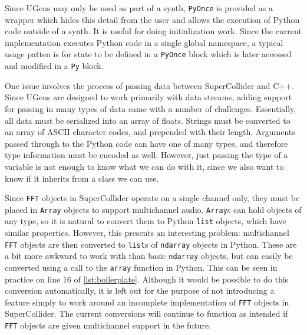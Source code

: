 \documentclass{article}
\begin{document}
Since UGens may only be used as part of a synth, \texttt{PyOnce} is provided as a wrapper which
hides this detail from the user and allows the execution of Python code outside of a synth. It is
useful for doing initialization work. Since the current implementation executes Python code in a
single global namespace, a typical usage patten is for state to be defined in a \texttt{PyOnce}
block which is later accessed and modified in a \texttt{Py} block.

One issue involves the process of passing data between SuperCollider and C++. Since UGens are
designed to work primarily with data streams, adding support for passing in many types of data came
with a number of challenges. Essentially, all data must be serialized into an array of floats.
Strings must be converted to an array of ASCII character codes, and prepended with their length.
Arguments passed through to the Python code can have one of many types, and therefore type
information must be encoded as well. However, just passing the type of a variable is not enough to
know what we can do with it, since we also want to know if it inherits from a class we can use.

Since \texttt{FFT} objects in SuperCollider operate on a single channel only, they must be placed
in \texttt{Array} objects to support multichannel audio. \texttt{Array}s can hold objects of any
type, so it is natural to convert them to Python \texttt{list} objects, which have similar
properties. However, this presents an interesting problem: multichannel \texttt{FFT} objects are
then converted to \texttt{list}s of \texttt{ndarray} objects in Python. These are a bit more
awkward to work with than basic \texttt{ndarray} objects, but can easily be converted using a call
to the \texttt{array} function in Python. This can be seen in practice on line 16 of
\autoref{lst:boilerplate}. Although it would be possible to do this conversion
automatically, it is left out for the purpose of not introducing a feature simply to work around an
incomplete implementation of \texttt{FFT} objects in SuperCollider. The current conversions will
continue to function as intended if \texttt{FFT} objects are given multichannel support in the
future.
\end{document}
